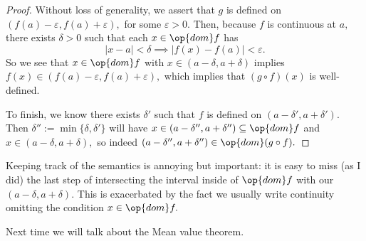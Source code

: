 \begin{proof}
	Without loss of generality, we assert that $g$ is defined on $(f(a)-\varepsilon,f(a)+\varepsilon),$ for some $\varepsilon>0.$ Then, because $f$ is continuous at $a,$ there exists $\delta>0$ such that each $x\in\op{dom}f$ has
	\[|x-a|<\delta\implies|f(x)-f(a)|<\varepsilon.\]
	So we see that $x\in\op{dom}f$ with $x\in(a-\delta,a+\delta)$ implies $f(x)\in(f(a)-\varepsilon,f(a)+\varepsilon),$ which implies that $(g\circ f)(x)$ is well-defined.

	To finish, we know there exists $\delta'$ such that $f$ is defined on $(a-\delta',a+\delta').$ Then $\delta'':=\min\{\delta,\delta'\}$ will have $x\in(a-\delta'',a+\delta'')\subseteq\op{dom}f$ and $x\in(a-\delta,a+\delta),$ so indeed $(a-\delta'',a+\delta'')\in\op{dom}(g\circ f).$
\end{proof}
\begin{remark}
	Keeping track of the semantics is annoying but important: it is easy to miss (as I did) the last step of intersecting the interval inside of $\op{dom}f$ with our $(a-\delta,a+\delta).$ This is exacerbated by the fact we usually write continuity omitting the condition $x\in\op{dom}f.$
\end{remark}
Next time we will talk about the Mean value theorem.